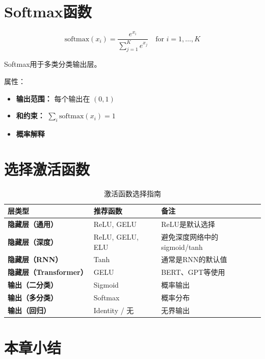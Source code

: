 \section{Softmax函数}

\begin{equation}
\text{softmax}(x_i) = \frac{e^{x_i}}{\sum_{j=1}^{K} e^{x_j}} \quad \text{for } i = 1, \ldots, K
\end{equation}

Softmax用于多类分类输出层。

属性：
\begin{itemize}
    \item \textbf{输出范围：} 每个输出在 $(0, 1)$
    \item \textbf{和约束：} $\sum_i \text{softmax}(x_i) = 1$
    \item \textbf{概率解释}
\end{itemize}

\section{选择激活函数}

\begin{table}[h]
    \centering
    \caption{激活函数选择指南}
    \begin{tabular}{L{3cm} L{5cm} L{4cm}}
        \toprule
        \textbf{层类型} & \textbf{推荐函数} & \textbf{备注} \\
        \midrule
        \textbf{隐藏层（通用）} & ReLU, GELU & ReLU是默认选择 \\
        \textbf{隐藏层（深度）} & ReLU, GELU, ELU & 避免深度网络中的sigmoid/tanh \\
        \textbf{隐藏层（RNN）} & Tanh & 通常是RNN的默认值 \\
        \textbf{隐藏层（Transformer）} & GELU & BERT、GPT等使用 \\
        \textbf{输出（二分类）} & Sigmoid & 概率输出 \\
        \textbf{输出（多分类）} & Softmax & 概率分布 \\
        \textbf{输出（回归）} & Identity / 无 & 无界输出 \\
        \bottomrule
    \end{tabular}
\end{table}

\section{本章小结}

